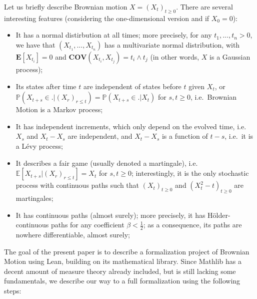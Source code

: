 \documentclass[lean]{DraftAFM}
\begin{document}
Let us briefly describe Brownian motion $X = (X_t)_{t\geq 0}$. There are several interesting features (considering the one-dimensional version and if $X_0=0$):
\begin{itemize}
\item It has a normal distirbution at all times; more precisely, for any $t_1,...,t_n > 0$, we have that $(X_{t_1},...,X_{t_n})$ has a multivariate normal distribution, with $\mathbf E[X_{t_i}] = 0$ and $\mathbf{COV}(X_{t_i}, X_{t_j}) = t_i \wedge t_j$ (in other words, $X$ is a Gaussian process);
\item Its states after time $t$ are independent of states before $t$ given $X_t$, or $\mathbb P(X_{t+s} \in . | (X_r)_{r\leq t}) = \mathbb P(X_{t+s} \in . | X_t)$ for $s,t \ge 0$, i.e.\ Brownian Motion is a Markov process;
\item It has independent increments, which only depend on the evolved time, i.e.\ $X_s$ and $X_t - X_s$ are independent, and $X_t - X_s$ is a function of $t-s$, i.e.\ it is a Lévy process;
\item It describes a fair game (usually denoted a martingale), i.e.\ $\mathbb E[X_{t+s} | (X_r)_{r\leq t}] = X_t$ for $s,t \geq 0$; interestingly, it is the only stochastic process with continuous paths such that $(X_t)_{t\geq 0}$ and $(X_t^2 - t)_{t\geq 0}$ are martingales;
\item It has continuous paths (almost surely); more precisely, it has Hölder-continuous paths for any coefficient $\beta < \tfrac 12$; as a consequence, its paths are nowhere differentiable, almost surely;
\end{itemize}
The goal of the present paper is to describe a formalization project of Brownian Motion using Lean, building on its mathematical library. Since Mathlib has a decent amount of measure theory already included, but is still lacking some fundamentals, we describe our way to a full formalization using the following steps:
\end{document}
